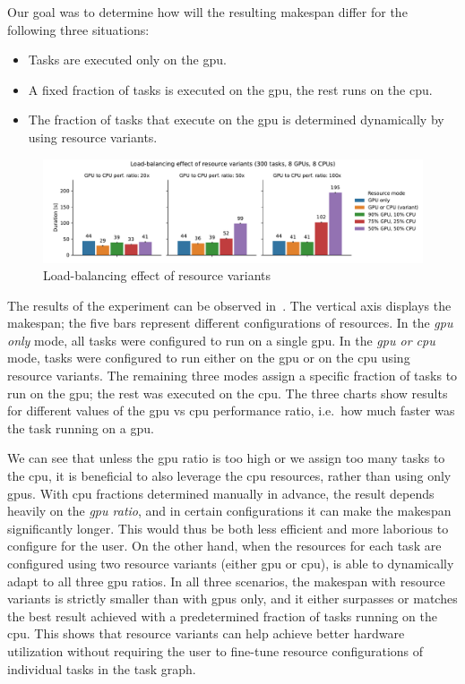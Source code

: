 Our goal was to determine how will the resulting makespan differ for the following three situations:
\begin{itemize}[itemsep=0pt]
	\item Tasks are executed only on the \gls{gpu}.
	\item A fixed fraction of tasks is executed on the \gls{gpu}, the rest runs on the \gls{cpu}.
	\item The fraction of tasks that execute on the \gls{gpu} is determined dynamically by \hyperqueue{} using resource variants.
\end{itemize}

\begin{figure}[h]
	\centering
	\includegraphics[width=\textwidth]{imgs/hq/charts/alternative-resources}
	\caption{Load-balancing effect of resource variants}
	\label{fig:hq-resource-variants}
\end{figure}

The results of the experiment can be observed in~. The vertical axis
displays the makespan; the five bars represent different configurations of resources. In the
\emph{\gls{gpu} only} mode, all tasks were configured to run on a single \gls{gpu}.
In the \emph{\gls{gpu} or \gls{cpu}} mode, tasks were configured to run either on the
\gls{gpu} or on the \gls{cpu} using resource variants. The remaining
three modes assign a specific fraction of tasks to run on the \gls{gpu}; the rest
was executed on the \gls{cpu}. The three charts show results for different values of
the \gls{gpu} vs \gls{cpu} performance ratio, i.e.\ how much faster was
the task running on a \gls{gpu}.

We can see that unless the \gls{gpu} ratio is too high or we assign too many tasks to
the \gls{cpu}, it is beneficial to also leverage the \gls{cpu}
resources, rather than using only \glspl{gpu}. With \gls{cpu} fractions
determined manually in advance, the result depends heavily on the \emph{\gls{gpu} ratio}, and in
certain configurations it can make the makespan significantly longer. This would thus be both less
efficient and more laborious to configure for the user. On the other hand, when the resources for
each task are configured using two resource variants (either \gls{gpu} or
\gls{cpu}), \hyperqueue{} is able to dynamically adapt to all three
\gls{gpu} ratios. In all three scenarios, the makespan with resource variants is
strictly smaller than with \glspl{gpu} only, and it either surpasses or matches the
best result achieved with a predetermined fraction of tasks running on the \gls{cpu}.
This shows that resource variants can help achieve better hardware utilization without requiring
the user to fine-tune resource configurations of individual tasks in the task graph.

